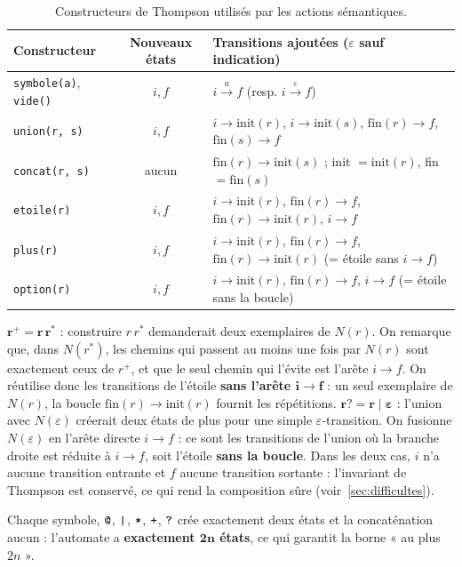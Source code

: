 \documentclass[12pt,a4paper]{article}
\newcommand{\code}[1]{{\fontsize{10}{12}\selectfont\texttt{#1}}}
\newcommand{\eps}{\ensuremath{\varepsilon}}
\newcommand{\tok}[1]{\ensuremath{\text{\fontsize{10}{12}\selectfont\ttfamily #1}}}
\begin{document}
\begin{table}[H]
\centering\small
\begin{tabularx}{\linewidth}{l c L}
\toprule
Constructeur & Nouveaux états & Transitions ajoutées (\eps{} sauf indication) \\
\midrule
\code{symbole(a)}, \code{vide()} & $i, f$ & $i \xrightarrow{a} f$ \quad (resp. $i \xrightarrow{\varepsilon} f$) \\
\code{union(r, s)}  & $i, f$ & $i \to \mathrm{init}(r)$, $i \to \mathrm{init}(s)$, $\mathrm{fin}(r) \to f$, $\mathrm{fin}(s) \to f$ \\
\code{concat(r, s)} & aucun  & $\mathrm{fin}(r) \to \mathrm{init}(s)$ ; init $= \mathrm{init}(r)$, fin $= \mathrm{fin}(s)$ \\
\code{etoile(r)}    & $i, f$ & $i \to \mathrm{init}(r)$, $\mathrm{fin}(r) \to f$, $\mathrm{fin}(r) \to \mathrm{init}(r)$, $i \to f$ \\
\code{plus(r)}      & $i, f$ & $i \to \mathrm{init}(r)$, $\mathrm{fin}(r) \to f$, $\mathrm{fin}(r) \to \mathrm{init}(r)$ \quad (= étoile sans $i \to f$) \\
\code{option(r)}    & $i, f$ & $i \to \mathrm{init}(r)$, $\mathrm{fin}(r) \to f$, $i \to f$ \quad (= étoile sans la boucle) \\
\bottomrule
\end{tabularx}
\caption{Constructeurs de Thompson utilisés par les actions sémantiques.}
\end{table}

\textbf{$\boldsymbol{r^+ = r\,r^*}$} : construire $r\,r^*$ demanderait deux exemplaires de
$N(r)$. On remarque que, dans $N(r^*)$, les chemins qui passent au moins une fois par $N(r)$ sont
exactement ceux de $r^+$, et que le seul chemin qui l'évite est l'arête $i \to f$. On réutilise
donc les transitions de l'étoile \textbf{sans l'arête $\boldsymbol{i \to f}$} : un seul
exemplaire de $N(r)$, la boucle $\mathrm{fin}(r) \to \mathrm{init}(r)$ fournit les répétitions.
\textbf{$\boldsymbol{r? = r \mid \varepsilon}$} : l'union avec $N(\varepsilon)$ créerait deux
états de plus pour une simple \eps-transition. On fusionne $N(\varepsilon)$ en l'arête directe
$i \to f$ : ce sont les transitions de l'union où la branche droite est réduite à $i \to f$, soit
l'étoile \textbf{sans la boucle}. Dans les deux cas, $i$ n'a aucune transition entrante et $f$
aucune transition sortante : l'invariant de Thompson est conservé, ce qui rend la composition
sûre (voir~\ref{sec:difficultes}).

Chaque symbole, \tok{@}, \tok{|}, \tok{*}, \tok{+}, \tok{?} crée exactement deux états et la
concaténation aucun : l'automate a \textbf{exactement $\boldsymbol{2n}$ états}, ce qui garantit
la borne « au plus $2n$ ».
\end{document}
